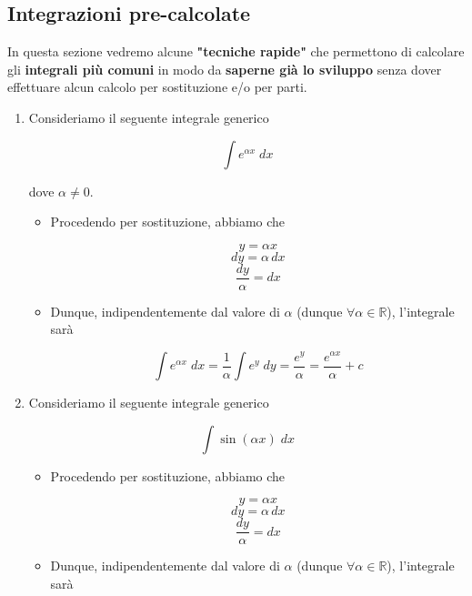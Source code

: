 \documentclass[a4paper, 12pt]{report}
\begin{document}
    \newpage
    
    \subsection{Integrazioni pre-calcolate}
    
    In questa sezione vedremo alcune \textbf{"tecniche rapide"} che permettono di calcolare gli \textbf{integrali più comuni} in modo da \textbf{saperne già lo sviluppo} senza dover effettuare alcun calcolo per sostituzione e/o per parti.
    
    \begin{enumerate}
        \item Consideriamo il seguente integrale generico
        
        \[ \int e^{\alpha x} \; dx\]
        
        dove $\alpha \neq 0$.
        
        \begin{itemize}
            \item Procedendo per sostituzione, abbiamo che
            
            \[ y = \alpha x\]
            \[ dy = \alpha \, dx \]
            \[ \frac{dy}{\alpha} = dx \]
            
            \item Dunque, indipendentemente dal valore di $\alpha$ (dunque $\forall \alpha \in \mathbb{R}$), l'integrale sarà
            
            \[ \int e^{\alpha x} \; dx = \frac{1}{\alpha} \int e^y \; dy = \frac{e^y}{\alpha} = \frac{e^{\alpha x}}{\alpha}+c\]
            
        \end{itemize}
        
        \quad
        
        \quad
        
        
        \item Consideriamo il seguente integrale generico
        
        \[ \int \sin(\alpha x) \; dx\]
        
        \begin{itemize}
            \item Procedendo per sostituzione, abbiamo che
            
            \[ y = \alpha x\]
            \[ dy = \alpha \, dx \]
            \[ \frac{dy}{\alpha} = dx \]
            
            \item Dunque, indipendentemente dal valore di $\alpha$ (dunque $\forall \alpha \in \mathbb{R}$), l'integrale sarà
            

\end{itemize}
\end{enumerate}
\end{document}
